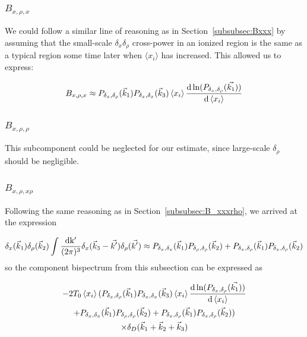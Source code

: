 \subsubsection*{$B_{x,\rho,x}$}
\label{subsubsec:Bxrhox}
We could follow a similar line of reasoning as in Section~\ref{subsubsec:Bxxx} by assuming that the small-scale $\delta_x\delta_{\rho}$ cross-power in an ionized region is the same as a typical region some time later when $\langle x_i \rangle$ has increased. This allowed us to express:

\begin{equation}
B_{x,\rho,x} \approx P_{\delta_x,\delta_{\rho}}(\vec{k}_1) P_{\delta_x,\delta_x}(\vec{k}_3)\left\langle x_i \right\rangle \frac{{\rm d} \ln (P_{\delta_x,\delta_{\rho}}(\vec{k_1}))}{{\rm d}\left\langle x_i \right\rangle}
\end{equation}

\subsubsection*{$B_{x,\rho,\rho}$}
\label{subsubsec:Bxrhorho}
This subcomponent could be neglected for our estimate, since large-scale $\delta_{\rho}$ should be negligible.

\subsubsection*{$B_{x,\rho,x\rho}$}
\label{subsubsec:Bxrhoxrho}

Following the same reasoning as in Section~\ref{subsubsec:B_xxxrho}, we arrived at the expression

\begin{equation}
\delta_x(\vec{k}_1)\delta_{\rho}(\vec{k}_2) \int \frac{\rm{d}k'}{(2\pi)^3}\delta_x(\vec{k}_3-\vec{k'})\delta_{\rho}(\vec{k'})
\approx
P_{\delta_x,\delta_x}(\vec{k}_1)P_{\delta_{\rho},\delta_{\rho}}(\vec{k}_2) + P_{\delta_x,\delta_{\rho}}(\vec{k}_1)P_{\delta_x,\delta_{\rho}}(\vec{k}_2)
\end{equation}
so the component bispectrum from this subsection can be expressed as

\begin{multline}
-2 T_0 \left\langle x_i \right\rangle ( P_{\delta_x,\delta_{\rho}}(\vec{k}_1) P_{\delta_x,\delta_x}(\vec{k}_3)\left\langle x_i \right\rangle \frac{{\rm d} \ln (P_{\delta_x,\delta_{\rho}}(\vec{k_1}))}{{\rm d}\left\langle x_i \right\rangle} \\+  P_{\delta_x,\delta_x}(\vec{k}_1)P_{\delta_{\rho},\delta_{\rho}}(\vec{k}_2) + P_{\delta_x,\delta_{\rho}}(\vec{k}_1)P_{\delta_x,\delta_{\rho}}(\vec{k}_2) ) \\ 
\times \delta_D(\vec{k}_1+\vec{k}_2+\vec{k}_3)
\end{multline}

